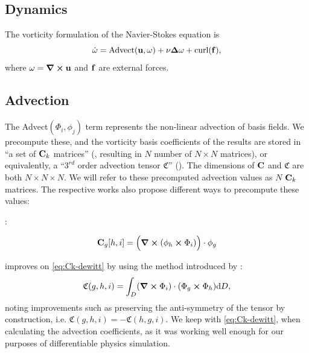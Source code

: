 
\subsection*{Dynamics}


The vorticity formulation of the Navier-Stokes equation is
\begin{equation}\label{eq:NSE-vorticity}
    \dot{\bf{\omega}} = \text{Advect}(\bf{u}, \bf{\omega}) + \nu \Delta\bf{\omega}
    + \text{curl}(\bf{f}),
\end{equation}
where $\bf{\omega} = \curl{\bf{u}}$ and $\bf{f}$ are external forces.

\subsection*{Advection}
The Advect$(\Phi_i, \phi_j)$ term represents the non-linear advection of basis
fields. We precompute these, and the vorticity basis coefficients of the results
are stored in ``a set of $\vb{C}_k$ matrices'' (\cite{dewitt}, resulting in $N$
number of $N \times N$ matrices), or equivalently, a ``$3^{rd}$ order advection
tensor $\mathfrak{C}$'' (\cite{scalable-eigenfluids}).  The dimensions of
$\vb{C}$ and $\mathfrak{C}$ are both $N \times N \times N$. We will refer to
these precomputed advection values as $N$ $\vb{C}_k$ matrices.
The respective works also propose different ways to precompute these values:

\cite{dewitt}:

\begin{equation}\label{eq:Ck-dewitt}
\vb{C}_g[h, i] = \Big( \curl(\phi_h \cross \Phi_i)\Big)\cdot \phi_g
\end{equation}

\cite{scalable-eigenfluids} improves on \eqref{eq:Ck-dewitt} by using the method
introduced by \cite{ModelReductionFluidSim}:
\begin{equation}
    \mathfrak{C}(g,h,i) = \int_D (\curl{\Phi_i})\cdot (\Phi_g \cross \Phi_h)
    \text{d}D,
\end{equation}
noting improvements such as preserving the anti-symmetry of the tensor by
construction, i.e. $\mathfrak{C}(g,h,i) = -\mathfrak{C}(h,g,i)$. We keep with
\eqref{eq:Ck-dewitt}, when calculating the advection coefficients, as it was
working well enough for our purposes of differentiable physics simulation.

